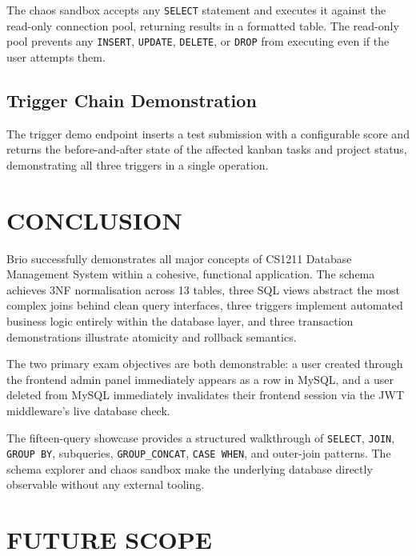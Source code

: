 \documentclass[12pt,a4paper]{article}
\begin{document}
The chaos sandbox accepts any \texttt{SELECT} statement and executes it against the read-only
connection pool, returning results in a formatted table. The read-only pool prevents any
\texttt{INSERT}, \texttt{UPDATE}, \texttt{DELETE}, or \texttt{DROP} from executing even if
the user attempts them.

\subsection{Trigger Chain Demonstration}

The trigger demo endpoint inserts a test submission with a configurable score and returns the
before-and-after state of the affected kanban tasks and project status, demonstrating all three
triggers in a single operation.

\section{CONCLUSION}

Brio successfully demonstrates all major concepts of CS1211 Database Management System within
a cohesive, functional application. The schema achieves 3NF normalisation across 13 tables,
three SQL views abstract the most complex joins behind clean query interfaces, three triggers
implement automated business logic entirely within the database layer, and three transaction
demonstrations illustrate atomicity and rollback semantics.

The two primary exam objectives are both demonstrable: a user created through the frontend
admin panel immediately appears as a row in MySQL, and a user deleted from MySQL immediately
invalidates their frontend session via the JWT middleware's live database check.

The fifteen-query showcase provides a structured walkthrough of \texttt{SELECT}, \texttt{JOIN},
\texttt{GROUP BY}, subqueries, \texttt{GROUP\_CONCAT}, \texttt{CASE WHEN}, and outer-join
patterns. The schema explorer and chaos sandbox make the underlying database directly observable
without any external tooling.

\section{FUTURE SCOPE}
\end{document}
